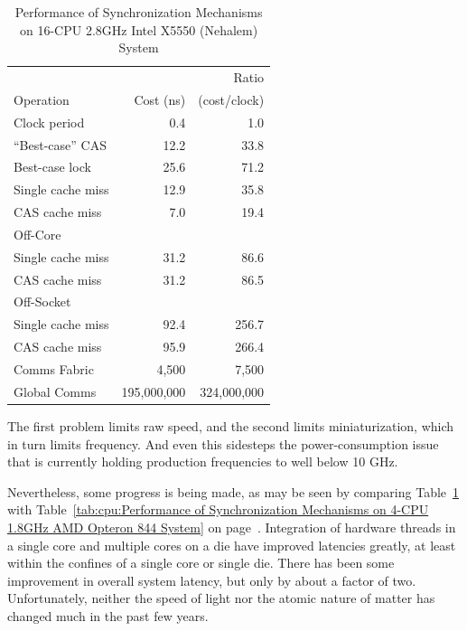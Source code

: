 \begin{table}
\centering
\begin{tabular}{l||r|r}
				& 	 	& Ratio \\
	Operation		& Cost (ns) 	& (cost/clock) \\
	\hline
	\hline
	Clock period		&           0.4	&           1.0 \\
	\hline
	``Best-case'' CAS	&          12.2	&          33.8 \\
	\hline
	Best-case lock		&          25.6	&          71.2 \\
	\hline
	Single cache miss	&          12.9	&          35.8 \\
	\hline
	CAS cache miss		&           7.0	&          19.4 \\
	\hline
	Off-Core		&		&		\\
	\hline
	Single cache miss	&          31.2	&          86.6 \\
	\hline
	CAS cache miss		&          31.2	&          86.5 \\
	\hline
	Off-Socket		&		&		\\
	\hline
	Single cache miss	&          92.4	&         256.7 \\
	\hline
	CAS cache miss		&          95.9	&         266.4 \\
	\hline
	Comms Fabric		&       4,500	&       7,500 \\
	\hline
	Global Comms		& 195,000,000	& 324,000,000 \\
\end{tabular}
\caption{Performance of Synchronization Mechanisms on 16-CPU 2.8GHz Intel X5550 (Nehalem) System}
\label{tab:cpu:Performance of Synchronization Mechanisms on 16-CPU 2.8GHz Intel X5550 (Nehalem) System}
\end{table}

	The first problem limits raw speed, and the second limits
	miniaturization, which in turn limits frequency.
	And even this sidesteps the power-consumption issue that
	is currently holding production frequencies to well below
	10 GHz.

	Nevertheless, some progress is being made, as may be seen
	by comparing
	Table~\ref{tab:cpu:Performance of Synchronization Mechanisms on 16-CPU 2.8GHz Intel X5550 (Nehalem) System}
	with
	Table~\ref{tab:cpu:Performance of Synchronization Mechanisms on 4-CPU 1.8GHz AMD Opteron 844 System}
	on
	page~\pageref{tab:cpu:Performance of Synchronization Mechanisms on 4-CPU 1.8GHz AMD Opteron 844 System}.
	Integration of hardware threads in a single core and multiple
	cores on a die have improved latencies greatly, at least within the
	confines of a single core or single die.
	There has been some improvement in overall system latency,
	but only by about a factor of two.
	Unfortunately, neither the speed of light nor the atomic nature
	of matter has changed much in the past few years.

